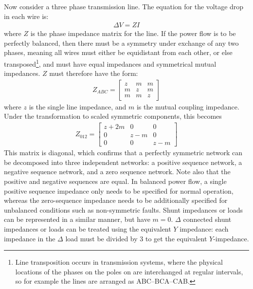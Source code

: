 \documentclass[11pt]{article}
\begin{document}
Now consider a three phase transmission line. The equation for the voltage drop in each wire is:
\begin{align}
	\Delta V = ZI
\end{align}
where $Z$ is the phase impedance matrix for the line. If the power flow is to be perfectly balanced, then there must be a symmetry under exchange of any two phases, meaning all wires must either be equidistant from each other, or else transposed\footnote{Line transposition occurs in transmission systems, where the physical locations of the phases on the poles on are interchanged at regular intervals, so for example the lines are arranged as ABC--BCA--CAB.}, and must have equal impedances and symmetrical mutual impedances. $Z$ must therefore have the form:
\begin{align}
	Z_{ABC} = \left[
			\begin{array}{lll}
				z & m & m \\
				m & z & m \\
				m & m & z
			\end{array}
		\right]
		\label{EQ_ZABC}
\end{align}
where $z$ is the single line impedance, and $m$ is the mutual coupling impedance. Under the transformation to scaled symmetric components, this becomes
\begin{align}
	Z_{012} = \left[
			\begin{array}{lll}
				z+2m & 0 & 0 \\
				0 & z-m & 0 \\
				0 & 0 & z-m
			\end{array}
		\right]
		\label{EQ_Z012}
\end{align}
This matrix is diagonal, which confirms that a perfectly symmetric network can be decomposed into three independent networks: a positive sequence network, a negative sequence network, and a zero sequence network. Note also that the positive and negative sequences are equal. In balanced power flow, a single positive sequence impedance only needs to be specified for normal operation, whereas the zero-sequence impedance needs to be additionally specified for unbalanced conditions such as non-symmetric faults. Shunt impedances or loads can be represented in a similar manner, but have $m = 0$. $\Delta$ connected shunt impedances or loads can be treated using the equivalent $Y$ impedance: each impedance in the $\Delta$ load must be divided by 3 to get the equivalent $Y$-impedance.
\end{document}
